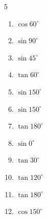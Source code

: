 \begin{multicols}{5}
\begin{enumerate}
        \phantom{$\displaystyle =1$}

  \item $\displaystyle \cos{60^\circ}$


  \item $\displaystyle \sin{90^\circ}$

        \phantom{$\displaystyle =1$}

\columnbreak %

  \item $\displaystyle \sin{45^\circ}$


  \item $\displaystyle \tan{60^\circ}$


  \item $\displaystyle \sin{150^\circ}$


  \item $\displaystyle \sin{150^\circ}$


  \item $\displaystyle \tan{180^\circ}$

        \phantom{$\displaystyle =0$}

  \item $\displaystyle \sin{0^\circ}$

        \phantom{$\displaystyle =0$}

  \item $\displaystyle \tan{30^\circ}$


  \item $\displaystyle \tan{120^\circ}$


  \item $\displaystyle \tan{180^\circ}$

        \phantom{$\displaystyle =0$}

  \item $\displaystyle \cos{150^\circ}$



\end{enumerate}
\end{multicols}
